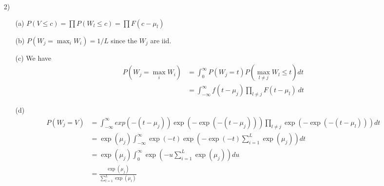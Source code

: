 \begin{enumerate}
\item[2)]
\begin{itemize}
\item[(a)] $P(V \leq c) = \prod P(W_l \leq c) = \prod F(c - \mu_l)$
\item[(b)] $P(W_j = \max_i W_i) = 1 / L$ since the $W_j$ are iid.
\item[(c)] We have
  \begin{align*}
    P(W_j = \max_i W_i) &= \int_0^\infty P(W_j = t) P(\max_{l \neq j} W_l \leq t) dt \\
    &=\int_{-\infty}^\infty f(t - \mu_j) \prod_{l \neq j} F(t - \mu_l) \>dt
  \end{align*}
\item[(d)]
  \begin{align*}
    P(W_j = V) &= \int_{-\infty}^\infty exp(-(t-\mu_j)) \exp(-\exp(-(t-\mu_j))) \prod_{l \neq j} \exp(-\exp(-(t-\mu_l))) dt \\
    &= \exp(\mu_j) \int_{-\infty}^\infty \exp(-t) \exp(-\exp(-t) \sum_{i=1}^L \exp(\mu_j)) dt \\
    &= \exp(\mu_j) \int_{0}^\infty \exp(- u \sum_{i=1}^L \exp(\mu_j)) du \\
    &= \frac{\exp(\mu_j)}{\sum_{l=1}^L \exp(\mu_l)}
  \end{align*}

\end{itemize}
\end{enumerate}
